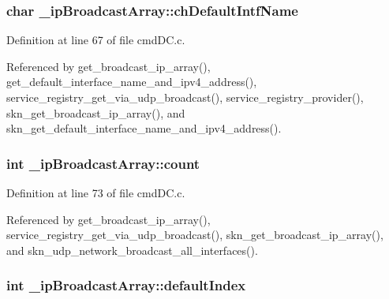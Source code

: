 \subsubsection[{ch\+Default\+Intf\+Name}]{\setlength{\rightskip}{0pt plus 5cm}char \+\_\+ip\+Broadcast\+Array\+::ch\+Default\+Intf\+Name}\label{struct__ip_broadcast_array_a06dab8742df19b5aec8538842617778d}


Definition at line 67 of file cmd\+D\+C.\+c.



Referenced by get\+\_\+broadcast\+\_\+ip\+\_\+array(), get\+\_\+default\+\_\+interface\+\_\+name\+\_\+and\+\_\+ipv4\+\_\+address(), service\+\_\+registry\+\_\+get\+\_\+via\+\_\+udp\+\_\+broadcast(), service\+\_\+registry\+\_\+provider(), skn\+\_\+get\+\_\+broadcast\+\_\+ip\+\_\+array(), and skn\+\_\+get\+\_\+default\+\_\+interface\+\_\+name\+\_\+and\+\_\+ipv4\+\_\+address().

\hypertarget{struct__ip_broadcast_array_a971377a4c995292b8bd908f185cfc844}{}
\subsubsection[{count}]{\setlength{\rightskip}{0pt plus 5cm}int \+\_\+ip\+Broadcast\+Array\+::count}\label{struct__ip_broadcast_array_a971377a4c995292b8bd908f185cfc844}


Definition at line 73 of file cmd\+D\+C.\+c.



Referenced by get\+\_\+broadcast\+\_\+ip\+\_\+array(), service\+\_\+registry\+\_\+get\+\_\+via\+\_\+udp\+\_\+broadcast(), skn\+\_\+get\+\_\+broadcast\+\_\+ip\+\_\+array(), and skn\+\_\+udp\+\_\+network\+\_\+broadcast\+\_\+all\+\_\+interfaces().

\hypertarget{struct__ip_broadcast_array_a5822ff77ae9f31bd3b4298d463c02f1f}{}
\subsubsection[{default\+Index}]{\setlength{\rightskip}{0pt plus 5cm}int \+\_\+ip\+Broadcast\+Array\+::default\+Index}\label{struct__ip_broadcast_array_a5822ff77ae9f31bd3b4298d463c02f1f}


